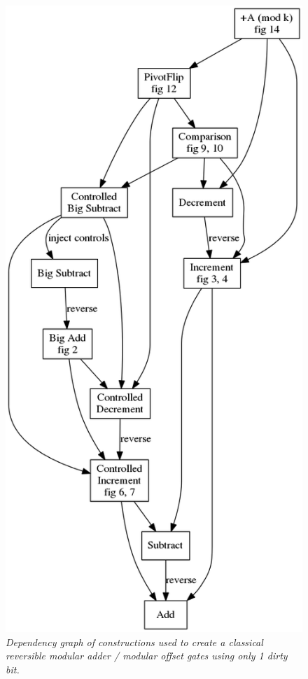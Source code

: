 \documentclass[twocolumn]{article}
\begin{document}
\begin{figure}
  \centering
  \includegraphics[totalheight=16cm]{modular-add-graph.png}
  \caption{\em
      Dependency graph of constructions used to create a classical reversible modular adder / modular offset gates using only 1 dirty bit.}
  \label{fig:modular-dependencies}
\end{figure}
\end{document}
